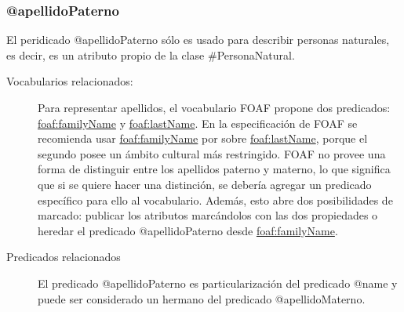 \subsubsection{@apellidoPaterno}

El peridicado @apellidoPaterno sólo es usado para describir personas
naturales, es decir, es un atributo propio de la clase
\#PersonaNatural.

\begin{description}
  
\item[{\sf Vocabularios relacionados:}]
  Para representar apellidos, el vocabulario FOAF propone dos
  predicados:
  \url{foaf:familyName} y \url{foaf:lastName}. En la especificación de
  FOAF se recomienda usar \url{foaf:familyName} por sobre
  \url{foaf:lastName}, porque el segundo posee un ámbito cultural más
  restringido. FOAF no provee una forma de distinguir entre los
  apellidos paterno y materno, lo que significa que si se quiere hacer
  una distinción, se debería agregar un predicado específico para ello
  al vocabulario. Además, esto abre dos posibilidades de marcado:
  publicar los atributos marcándolos con las dos propiedades o heredar
  el predicado @apellidoPaterno desde \url{foaf:familyName}.
\item[{\sf Predicados relacionados}]
  El predicado @apellidoPaterno es particularización del
  predicado @name y puede ser considerado un hermano del predicado
  @apellidoMaterno.
\end{description}
